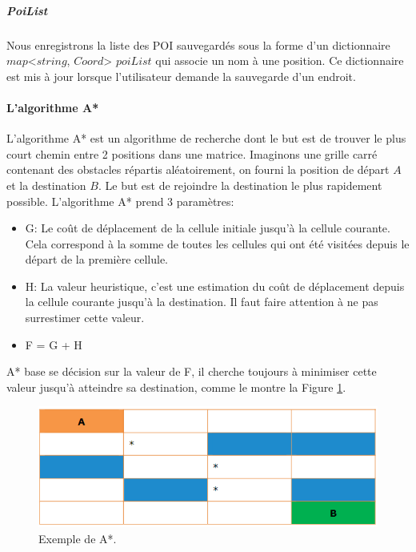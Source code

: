 \documentclass[11pt]{article}
\begin{document}
          \subparagraph{PoiList}   
            Nous enregistrons la liste des POI sauvegardés sous la forme d'un dictionnaire $map$<$string$, $Coord$> $poiList$ qui associe
            un nom à une position. Ce dictionnaire est mis à jour lorsque l'utilisateur demande la sauvegarde d'un endroit.            

        \paragraph{L'algorithme A*}
          L'algorithme A* est un algorithme de recherche dont le but est de trouver le plus court chemin entre 2 positions dans une matrice.
          Imaginons une grille carré contenant des obstacles répartis aléatoirement, on fourni la position de départ $A$ et la destination $B$.
          Le but est de rejoindre la destination le plus rapidement possible.
          L'algorithme A* prend 3 paramètres:

          \begin{itemize}
            \item G: Le coût de déplacement de la cellule initiale jusqu'à la cellule courante. Cela correspond à la somme de toutes les 
            cellules qui ont été visitées depuis le départ de la première cellule.
            \item H: La valeur heuristique, c'est une estimation du coût de déplacement depuis la cellule courante jusqu'à la destination. 
            Il faut faire attention à ne pas surrestimer cette valeur.
            \item F = G + H            
          \end{itemize} 
          A* base se décision sur la valeur de F, il cherche toujours à minimiser cette valeur jusqu'à atteindre sa destination,
          comme le montre la Figure \ref{fig:Astar}.          
          
          \begin{figure}[hbt]  
            \includegraphics[width=\textwidth]{Astar.png}    
            \caption{Exemple de A*.}
            \label{fig:Astar}
          \end{figure} 
\end{document}
